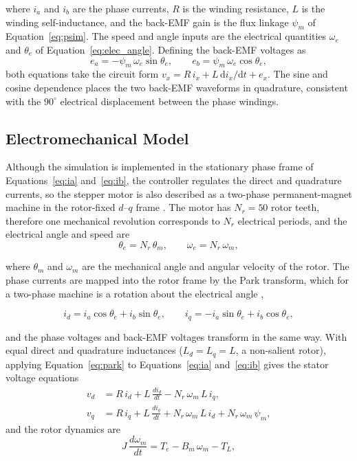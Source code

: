 where $i_a$ and $i_b$ are the phase currents, $R$ is the winding resistance, $L$ is the winding self-inductance, and the back-EMF gain is the flux linkage $\psi_m$ of Equation~\eqref{eq:psim}. The speed and angle inputs are the electrical quantities $\omega_e$ and $\theta_e$ of Equation~\eqref{eq:elec_angle}. Defining the back-EMF voltages as
\begin{equation}
	e_a = -\psi_m \, \omega_e \sin\theta_e, \qquad e_b = \psi_m \, \omega_e \cos\theta_e ,
	\label{eq:emf}
\end{equation}
both equations take the circuit form $v_x = R \, i_x + L \, \mathrm{d} i_x / \mathrm{d} t + e_x$. The sine and cosine dependence places the two back-EMF waveforms in quadrature, consistent with the $90^\circ$ electrical displacement between the phase windings.

\subsection{Electromechanical Model}

Although the simulation is implemented in the stationary phase frame of Equations~\eqref{eq:ia} and~\eqref{eq:ib}, the controller regulates the direct and quadrature currents, so the stepper motor is also described as a two-phase permanent-magnet machine in the rotor-fixed $d$--$q$ frame \cite{derammelaere_linear_2010,bernardi_performance_2022}. The motor has $N_r = 50$ rotor teeth, therefore one mechanical revolution corresponds to $N_r$ electrical periods, and the electrical angle and speed are
\begin{equation}
	\theta_e = N_r\,\theta_m, \qquad \omega_e = N_r\,\omega_m,
	\label{eq:elec_angle}
\end{equation}

where $\theta_m$ and $\omega_m$ are the mechanical angle and angular velocity of the rotor. The phase currents are mapped into the rotor frame by the Park transform, which for a two-phase machine is a rotation about the electrical angle \cite{bernardi_performance_2022,lai_modelling_2018},

\begin{equation}
	i_d = i_a \cos\theta_e + i_b \sin\theta_e, \qquad
	i_q = -i_a \sin\theta_e + i_b \cos\theta_e,
	\label{eq:park}
\end{equation}

and the phase voltages and back-EMF voltages transform in the same way. With equal direct and quadrature inductances ($L_d = L_q = L$, a non-salient rotor), applying Equation~\eqref{eq:park} to Equations~\eqref{eq:ia} and~\eqref{eq:ib} gives the stator voltage equations
\begin{align}
	v_d &= R\, i_d + L\,\frac{di_d}{dt} - N_r\,\omega_m\, L\, i_q,
	\label{eq:vd} \\
	v_q &= R\, i_q + L\,\frac{di_q}{dt} + N_r\,\omega_m\, L\, i_d
	+ N_r\,\omega_m\,\psi_m,
	\label{eq:vq}
\end{align}
and the rotor dynamics are
\begin{equation}
	J\,\frac{d\omega_m}{dt} = T_e - B_m\,\omega_m - T_L,
	\label{eq:mech}
\end{equation}

